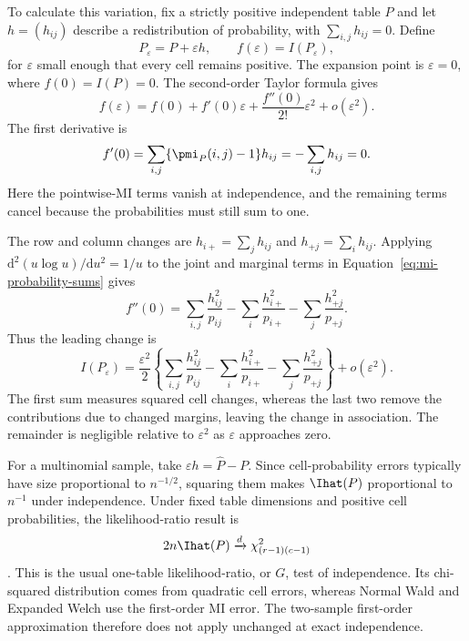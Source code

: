 To calculate this variation, fix a strictly positive independent table
\(P\) and let \(h=(h_{ij})\) describe a redistribution of probability,
with \(\sum_{i,j}h_{ij}=0\). Define
\begin{equation}
 P_\varepsilon=P+\varepsilon h,
 \qquad f(\varepsilon)=I(P_\varepsilon),
\end{equation}
for \(\varepsilon\) small enough that every cell remains positive.
The expansion point is \(\varepsilon=0\), where \(f(0)=I(P)=0\).
The second-order Taylor formula gives
\begin{equation}
 f(\varepsilon)
 =f(0)+f'(0)\varepsilon+\frac{f''(0)}{2!}\varepsilon^2
  +o(\varepsilon^2).
\end{equation}
The first derivative is
\begin{equation}
 f'(0)=\sum_{i,j}\{\pmi_P(i,j)-1\}h_{ij}
       =-\sum_{i,j}h_{ij}=0.
\end{equation}
Here the pointwise-MI terms vanish at independence, and the remaining
terms cancel because the probabilities must still sum to one.

The row and column changes are \(h_{i+}=\sum_jh_{ij}\) and
\(h_{+j}=\sum_ih_{ij}\). Applying
\(\mathrm d^2(u\log u)/\mathrm du^2=1/u\) to the joint and marginal
terms in Equation~\eqref{eq:mi-probability-sums} gives
\begin{equation}
 f''(0)=\sum_{i,j}\frac{h_{ij}^2}{p_{ij}}
        -\sum_i\frac{h_{i+}^2}{p_{i+}}
        -\sum_j\frac{h_{+j}^2}{p_{+j}}.
\end{equation}
Thus the leading change is
\begin{equation}
 I(P_\varepsilon)
 =\frac{\varepsilon^2}{2}
  \left\{\sum_{i,j}\frac{h_{ij}^2}{p_{ij}}
        -\sum_i\frac{h_{i+}^2}{p_{i+}}
        -\sum_j\frac{h_{+j}^2}{p_{+j}}\right\}
  +o(\varepsilon^2).
 \label{eq:appendix-mi-second-order}
\end{equation}
The first sum measures squared cell changes, whereas the last two remove the
contributions due to changed margins, leaving the change in association.
The remainder is negligible relative to \(\varepsilon^2\) as
\(\varepsilon\) approaches zero.

For a multinomial sample, take \(\varepsilon h=\widehat P-P\).
Since cell-probability errors typically have size proportional to \(n^{-1/2}\),
squaring them makes \(\Ihat(P)\) proportional to \(n^{-1}\) under
independence. Under fixed table dimensions and positive cell probabilities,
the likelihood-ratio result is
\begin{equation}
 2n\Ihat(P)\xrightarrow{d}\chi^2_{(r-1)(c-1)}
 \label{eq:independence-chi-squared}
\end{equation}
\citep{wilks1938,brillinger2004}. This is the usual one-table likelihood-ratio,
or \(G\), test of independence. Its chi-squared distribution comes from
quadratic cell errors, whereas Normal Wald and Expanded Welch use the
first-order MI error. The two-sample first-order approximation therefore
does not apply unchanged at exact independence.

